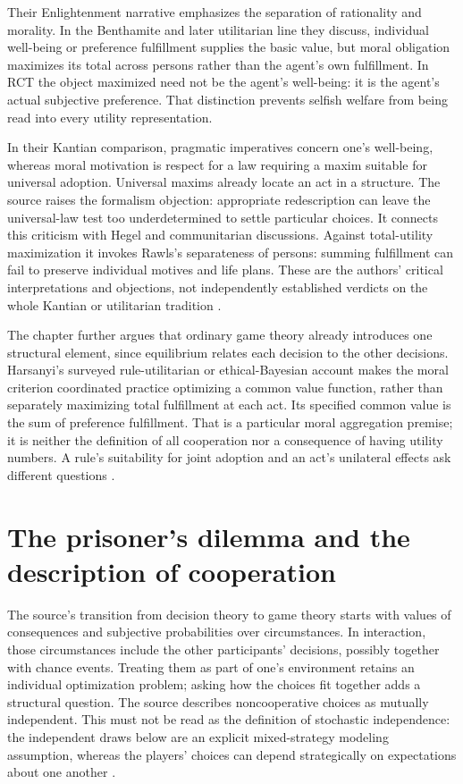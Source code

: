 Their Enlightenment narrative emphasizes the separation of rationality
and morality. In the Benthamite and later utilitarian line they discuss,
individual well-being or preference fulfillment supplies the basic value,
but moral obligation maximizes its total across persons rather than the
agent's own fulfillment. In RCT the object maximized need not be the
agent's well-being: it is the agent's actual subjective preference.
That distinction prevents selfish welfare from being read into every
utility representation.

In their Kantian comparison, pragmatic imperatives concern one's
well-being, whereas moral motivation is respect for a law requiring a
maxim suitable for universal adoption. Universal maxims already locate
an act in a structure. The source raises the formalism objection:
appropriate redescription can leave the universal-law test too
underdetermined to settle particular choices. It connects this criticism
with Hegel and communitarian discussions. Against total-utility
maximization it invokes Rawls's separateness of persons: summing
fulfillment can fail to preserve individual motives and life plans.
These are the authors' critical interpretations and objections, not
independently established verdicts on the whole Kantian or utilitarian
tradition \parencite[pp.~625--626]{NidaRumelinGutwaldZuber2021}.

The chapter further argues that ordinary game theory already introduces
one structural element, since equilibrium relates each decision to the
other decisions. Harsanyi's surveyed rule-utilitarian or ethical-Bayesian
account makes the moral criterion coordinated practice optimizing a
common value function, rather than separately maximizing total
fulfillment at each act. Its specified common value is the sum of
preference fulfillment. That is a particular moral aggregation premise;
it is neither the definition of all cooperation nor a consequence of
having utility numbers. A rule's suitability for joint adoption and an
act's unilateral effects ask different questions
\parencite[p.~626]{NidaRumelinGutwaldZuber2021}.

\section{The prisoner's dilemma and the description of cooperation}
\label{sec:p11-rat105-cooperation}

The source's transition from decision theory to game theory starts with
values of consequences and subjective probabilities over circumstances.
In interaction, those circumstances include the other participants'
decisions, possibly together with chance events. Treating them as part
of one's environment retains an individual optimization problem; asking
how the choices fit together adds a structural question. The source
describes noncooperative choices as mutually independent. This must not
be read as the definition of stochastic independence: the independent
draws below are an explicit mixed-strategy modeling assumption, whereas
the players' choices can depend strategically on expectations about one
another \parencite[p.~626]{NidaRumelinGutwaldZuber2021}.

